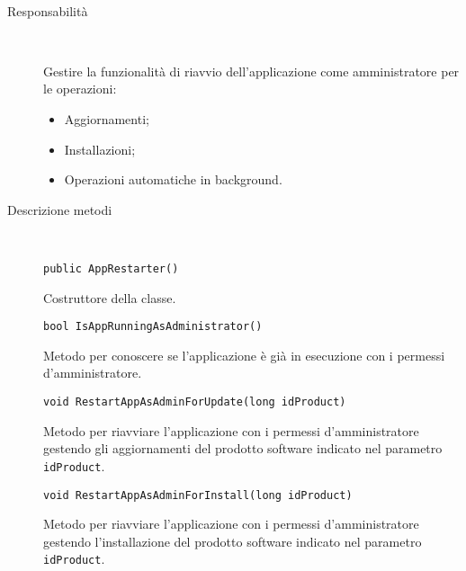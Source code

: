 		\paragraph*{}
		\label{AppRestarter}
		\begin{tcolorbox}[fonttitle=\bfseries, 
								adjusted title={\Large AppRestarter}, 
								breakable, 
								sharp corners=south,
								colback=white, 
								colframe=white!60!black]
								
				\begin{description}%
				
					\item[Responsabilità] \ \par 
        				Gestire la funzionalità di riavvio dell'applicazione come amministratore per le operazioni:
        				\begin{itemize}
        					\item Aggiornamenti;
        					\item Installazioni;
        					\item Operazioni automatiche in background.
        				\end{itemize}
        			\tcbline 
        				
        			\item[Descrizione metodi] \ \par
        				
        				\begin{lstlisting}
public AppRestarter()
						\end{lstlisting}
						Costruttore della classe.
						
						\begin{lstlisting}
bool IsAppRunningAsAdministrator()
						\end{lstlisting}
						Metodo per conoscere se l'applicazione è già in esecuzione con i permessi d'amministratore.
						
						\begin{lstlisting}
void RestartAppAsAdminForUpdate(long idProduct)
						\end{lstlisting}
						Metodo per riavviare l'applicazione con i permessi d'amministratore gestendo gli aggiornamenti del prodotto software indicato nel parametro \verb|idProduct|.  
						
						\begin{lstlisting}
void RestartAppAsAdminForInstall(long idProduct)
						\end{lstlisting}
						Metodo per riavviare l'applicazione con i permessi d'amministratore gestendo l'installazione del prodotto software indicato nel parametro \verb|idProduct|.  	
						

\end{description}
\end{tcolorbox}
